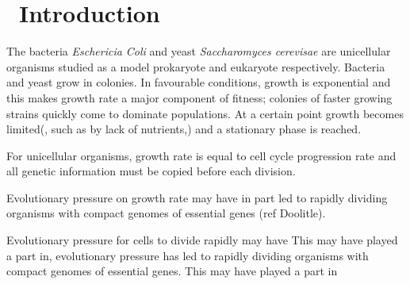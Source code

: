 \graphicspath{{images/}}

\section{\thesection~Introduction}
\label{sec:introduction}





The bacteria \textit{Eschericia Coli} and yeast \textit{Saccharomyces
  cerevisae} are unicellular organisms studied as a model prokaryote
and eukaryote respectively. Bacteria and yeast grow in colonies. In
favourable conditions, growth is exponential and this makes growth
rate a major component of fitness; colonies of faster growing strains
quickly come to dominate populations. At a certain point growth
becomes limited(, such as by lack of nutrients,) and a stationary phase
is reached.


For unicellular organisms, growth rate is equal to cell cycle
progression rate and all genetic information must be copied before
each division.


Evolutionary pressure on growth rate may have in part led to rapidly
dividing organisms with compact genomes of essential genes (ref
Doolitle).

Evolutionary pressure for cells to divide rapidly may have
This may have played a part in, evolutionary pressure
has led to rapidly dividing organisms with compact genomes of
essential genes. This may have played a part in

